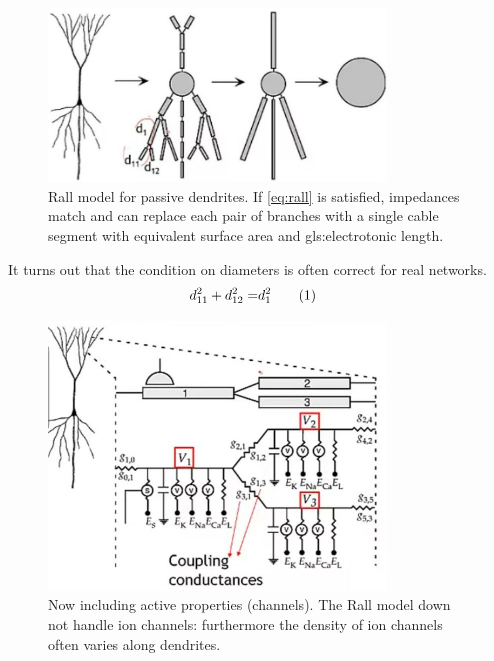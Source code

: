 \documentclass[]{article}
\newcommand\numberthis{\addtocounter{equation}{1}\tag{\theequation}}
\begin{document}
\begin{figure}[H]
	\caption[Rall model for passive dendrites]{Rall model for passive dendrites. If \eqref{eq:rall} is satisfied, impedances match and can replace each pair of branches with a single cable segment with equivalent surface area and \gls{gls:electrotonic}  length.} 
	\includegraphics[width=0.8\textwidth]{rall-model}
\end{figure}
It turns out that the condition on diameters is often correct for real networks.
\begin{align*}
	d_{11}^2 + 	d_{12}^2 =& 	d_{1}^2 \numberthis \label{eq:rall}
\end{align*}

\begin{figure}[H]
	\caption[Now including active properties (channels).]{Now including active properties (channels). The Rall model down not handle ion channels: furthermore the density of ion channels often varies along dendrites.}
	\includegraphics[width=0.8\textwidth]{full-model}
\end{figure}
\end{document}
